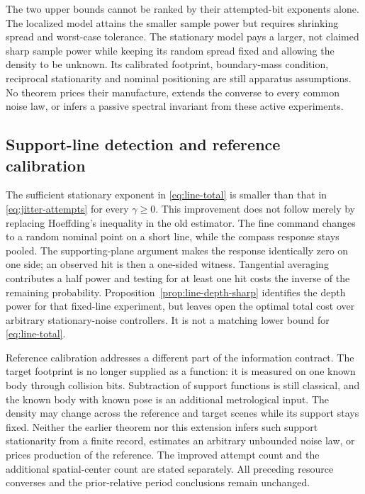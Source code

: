 The two upper bounds cannot be ranked by their attempted-bit exponents
alone. The localized model attains the smaller sample power but requires
shrinking spread and worst-case tolerance. The stationary model pays a
larger, not claimed sharp sample power while keeping its random spread
fixed and allowing the density to be unknown. Its calibrated footprint,
boundary-mass condition, reciprocal stationarity and nominal positioning
are still apparatus assumptions. No theorem prices their manufacture,
extends the converse to every common noise law, or infers a passive
spectral invariant from these active experiments.


\subsection{Support-line detection and reference calibration}
The sufficient stationary exponent in \eqref{eq:line-total} is smaller
than that in \eqref{eq:jitter-attempts} for every $\gamma\ge0$.
This improvement does not follow merely by replacing Hoeffding's
inequality in the old estimator. The fine command changes to a random
nominal point on a short line, while the compass response stays pooled.
The supporting-plane argument makes the response identically zero on
one side; an observed hit is then a one-sided witness. Tangential
averaging contributes a half power and testing for at least one hit
costs the inverse of the remaining probability. Proposition~\ref{prop:line-depth-sharp}
identifies the depth power for that fixed-line experiment, but leaves
open the optimal total cost over arbitrary stationary-noise controllers.
It is not a matching lower bound for \eqref{eq:line-total}.

Reference calibration addresses a different part of the information
contract. The target footprint is no longer supplied as a function:
it is measured on one known body through collision bits. Subtraction of
support functions is still classical, and the known body with known
pose is an additional metrological input. The density may change across
the reference and target scenes while its support stays fixed. Neither
the earlier theorem nor this extension infers such support stationarity
from a finite record, estimates an arbitrary unbounded noise law, or
prices production of the reference. The improved attempt count and the
additional spatial-center count are stated separately. All preceding
resource converses and the prior-relative period conclusions remain
unchanged.
